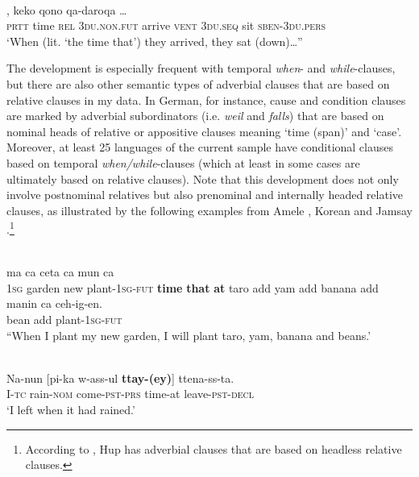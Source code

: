 \documentclass[output=paper]{langsci/langscibook}
\begin{document}
\ea\label{ex:diessel:11}
\\
,  keko  qono  qa-daroqa …\\
        \textsc{prtt}   time  \textsc{rel}   3\textsc{du.non.fut}  arrive  \textsc{vent}  \textsc{3du.seq}  sit  \textsc{sben-3du.pers}\\
\glt   `When (lit. ‘the time that’) they arrived, they sat (down)…”
\z

The development is especially frequent with temporal \textit{when}- and \textit{while}-clauses, but there are also other semantic types of adverbial clauses that are based on relative clauses in my data. In German, for instance, cause and condition clauses are marked by adverbial subordinators (i.e. \textit{weil} and \textit{falls}) that are based on nominal heads of relative or appositive clauses meaning ‘time (span)’ and ‘case’. Moreover, at least 25 languages of the current sample have conditional clauses based on temporal \textit{when/while}-clauses (which at least in some cases are ultimately based on relative clauses). Note that this development does not only involve postnominal relatives but also prenominal and internally headed relative clauses, as illustrated by the following examples from Amele , Korean  and Jamsay .\footnote{According to \citet{Epps2009}, Hup has adverbial clauses that are based on headless relative clauses.} 

\ea\label{ex:diessel:12}
\\
   ma   ca  ceta  ca   mun    ca\\
        1\textsc{sg}   garden   new   plant-1\textsc{sg-fut}   \textbf{time}   \textbf{that   }\textbf{at}   taro   add  yam  add  banana  add\\
\gll   manin    ca  ceh-ig-en.\\
       bean    add  plant-\textsc{1sg-fut}\\
\glt “When I plant my new garden, I will plant taro, yam, banana and beans.'
\z

\ea\label{ex:diessel:13}
\\
\gll   Na-nun  [pi-ka  w-ass-ul   \textbf{ttay-(ey)}]    ttena-ss-ta.\\
       I-\textsc{tc}  rain-\textsc{nom}  come-\textsc{pst-prs}  time-at     leave-\textsc{pst-decl}\\
\glt   `I left when it had rained.' 
\z
\end{document}
